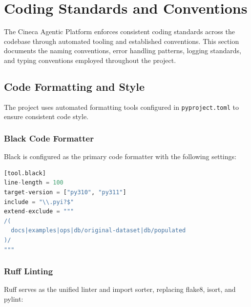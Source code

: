 
\section{Coding Standards and Conventions}
\label{sec:coding-standards}

The Cineca Agentic Platform enforces consistent coding standards across the codebase through automated tooling and established conventions. This section documents the naming conventions, error handling patterns, logging standards, and typing conventions employed throughout the project.

\subsection{Code Formatting and Style}

The project uses automated formatting tools configured in \texttt{pyproject.toml} to ensure consistent code style.

\subsubsection{Black Code Formatter}

Black is configured as the primary code formatter with the following settings:

\begin{lstlisting}[language=Python, caption={Black configuration from \texttt{pyproject.toml}.}]
[tool.black]
line-length = 100
target-version = ["py310", "py311"]
include = "\\.pyi?$"
extend-exclude = """
/(
  docs|examples|ops|db/original-dataset|db/populated
)/
"""
\end{lstlisting}

\subsubsection{Ruff Linting}

Ruff serves as the unified linter and import sorter, replacing flake8, isort, and pylint:

